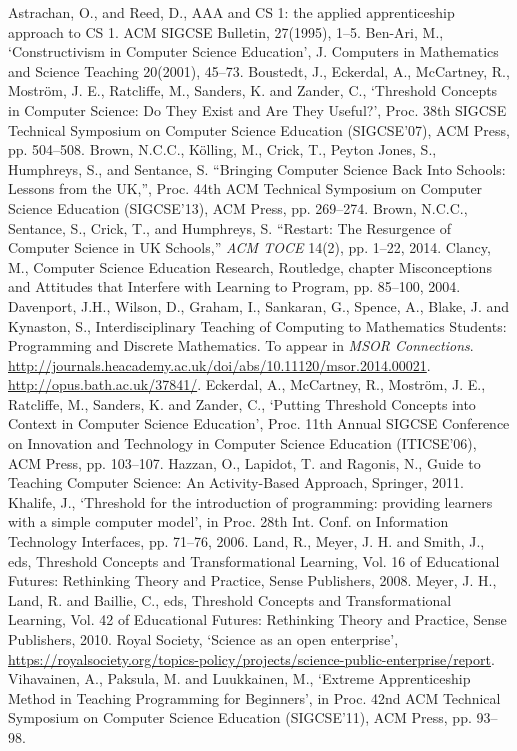 \documentclass[conference,compsoc]{IEEEtran}
\begin{document}
\begin{thebibliography}{10}

Astrachan, O., and Reed, D., AAA and CS 1: the applied apprenticeship approach to CS 1. ACM SIGCSE Bulletin, 27(1995), 1--5.
Ben-Ari, M., `Constructivism in Computer Science Education', J. Computers in Mathematics and Science Teaching 20(2001), 45--73.
Boustedt, J., Eckerdal, A., McCartney, R.,
  Mostr\"om, J. E., Ratcliffe, M., Sanders, K. and Zander, C.,
  `Threshold Concepts in Computer Science: Do They Exist and Are They
  Useful?', Proc. 38th SIGCSE Technical Symposium on Computer Science
  Education (SIGCSE'07), ACM Press, pp. 504--508.
Brown, N.C.C., K\"{o}lling, M., Crick, T., {Peyton Jones}, S., Humphreys,
S., and Sentance, S. ``{Bringing Computer Science Back Into Schools: Lessons
  from the UK},'', Proc. 44th ACM Technical Symposium on Computer
Science Education (SIGCSE'13), ACM Press, pp. 269--274.
Brown, N.C.C., Sentance, S., Crick, T., and Humphreys, S. ``{Restart: The Resurgence
  of Computer Science in UK Schools},'' \emph{{ACM TOCE}} 14(2), pp.
  1--22, 2014.
Clancy, M., Computer Science Education Research,
  Routledge, chapter Misconceptions and Attitudes that Interfere with
  Learning to Program, pp. 85--100, 2004.
Davenport, J.H., Wilson, D., Graham, I., Sankaran, G., Spence, A., Blake, J. and Kynaston, S.,
Interdisciplinary Teaching of Computing to Mathematics Students:
Programming and Discrete Mathematics.
To appear in {\it MSOR Connections\/}.
\url{http://journals.heacademy.ac.uk/doi/abs/10.11120/msor.2014.00021}.
\url{http://opus.bath.ac.uk/37841/}.
Eckerdal, A., McCartney, R., Mostr\"om, J. E., Ratcliffe, M., Sanders, K. and Zander, C., `Putting Threshold Concepts into Context in Computer Science Education', Proc. 11th Annual SIGCSE Conference on Innovation and Technology in Computer Science Education (ITICSE'06), ACM Press, pp. 103--107.
Hazzan, O., Lapidot, T. and Ragonis, N., Guide to Teaching Computer Science: An Activity-Based Approach, Springer, 2011.
Khalife, J., `Threshold for the introduction of
  programming: providing learners with a simple computer model', in
  Proc. 28th Int. Conf. on Information Technology Interfaces,
  pp. 71--76, 2006.
Land, R., Meyer, J. H. and Smith, J., eds, Threshold Concepts and Transformational Learning, Vol. 16 of Educational Futures: Rethinking Theory and Practice, Sense Publishers, 2008.
Meyer, J. H., Land, R. and Baillie, C., eds, Threshold Concepts and Transformational Learning, Vol. 42 of Educational Futures: Rethinking Theory and Practice, Sense Publishers, 2010.
Royal Society, `Science as an open enterprise', \url{https://royalsociety.org/topics-policy/projects/science-public-enterprise/report}.
Vihavainen, A., Paksula, M. and Luukkainen, M., `Extreme Apprenticeship Method in Teaching Programming for Beginners', in Proc. 42nd ACM Technical Symposium on Computer Science Education (SIGCSE'11), ACM Press, pp. 93--98.


\end{thebibliography}
\end{document}
